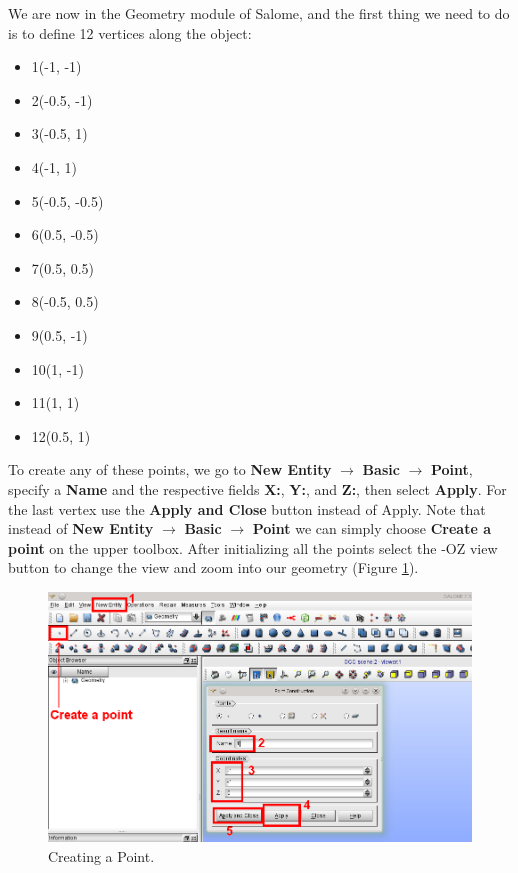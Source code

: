 We are now in the Geometry module of Salome, and the first thing we need to do is to define 12 vertices along the object: 
\begin{itemize}
 \item 1(-1, -1)
 \item 2(-0.5, -1)
 \item 3(-0.5, 1)
 \item 4(-1, 1)
 \item 5(-0.5, -0.5)
 \item 6(0.5, -0.5)
 \item 7(0.5, 0.5)
 \item 8(-0.5, 0.5)
 \item 9(0.5, -1)
 \item 10(1, -1)
 \item 11(1, 1)
 \item 12(0.5, 1)
\end{itemize}
To create any of these points, we go to \textbf{New Entity} $\rightarrow$ \textbf{Basic} $\rightarrow$ \textbf{Point}, specify a \textbf{Name} and the respective fields \textbf{X:}, \textbf{Y:}, and \textbf{Z:}, then select \textbf{Apply}. For the last vertex use the \textbf{Apply and Close} button instead of Apply. Note that instead of \textbf{New Entity} $\rightarrow$ \textbf{Basic} $\rightarrow$ \textbf{Point} we can simply choose \textbf{Create a point} on the upper toolbox. After initializing all the points select the -OZ view button to change the view and zoom into our geometry (Figure \ref{fig:no3.2.1.5}).

\begin{figure}[h!]
\begin{center}
\includegraphics[scale=0.50]{figures/SalomeStep1b.png}
\caption{Creating a Point.}
\label{fig:no3.2.1.5}
\end{center}
\end{figure}

